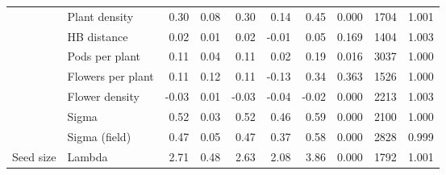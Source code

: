 \begin{table}[ht]
\begin{tabular}{l|l|r|r|r|r|r|r|r|r}
\cline{2-10}
 & Plant density & 0.30 & 0.08 & 0.30 & 0.14 & 0.45 & 0.000 & 1704 & 1.001\\
\cline{2-10}
 & HB distance & 0.02 & 0.01 & 0.02 & -0.01 & 0.05 & 0.169 & 1404 & 1.003\\
\cline{2-10}
 & Pods per plant & 0.11 & 0.04 & 0.11 & 0.02 & 0.19 & 0.016 & 3037 & 1.000\\
\cline{2-10}
 & Flowers per plant & 0.11 & 0.12 & 0.11 & -0.13 & 0.34 & 0.363 & 1526 & 1.000\\
\cline{2-10}
 & Flower density & -0.03 & 0.01 & -0.03 & -0.04 & -0.02 & 0.000 & 2213 & 1.003\\
\cline{2-10}
 & Sigma & 0.52 & 0.03 & 0.52 & 0.46 & 0.59 & 0.000 & 2100 & 1.000\\
\cline{2-10}
 & Sigma (field) & 0.47 & 0.05 & 0.47 & 0.37 & 0.58 & 0.000 & 2828 & 0.999\\
\cline{2-10}
\multirow{-14}{*}{\raggedright\arraybackslash Seed size} & Lambda & 2.71 & 0.48 & 2.63 & 2.08 & 3.86 & 0.000 & 1792 & 1.001\\
\hline
\end{tabular}

\end{table}